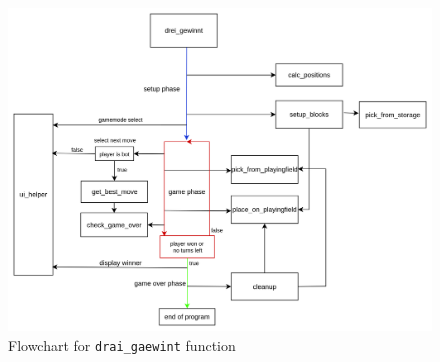 \documentclass{article}
\begin{document}
        \begin{figure}[htbp]
            \centering
            \includegraphics[width=\textwidth]{../media/drai_gaewint.png}
            \caption{Flowchart for \texttt{drai\_gaewint} function}\label{fig:drai_gaewint}
        \end{figure}
\end{document}
